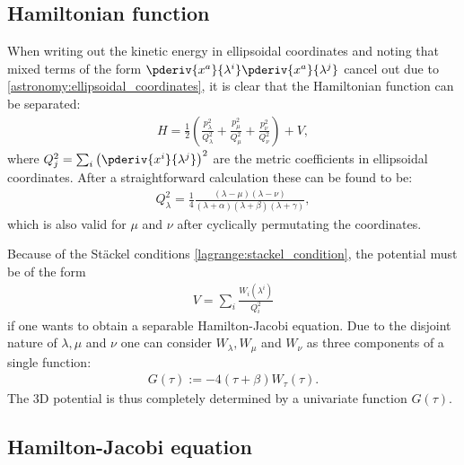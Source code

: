 \subsection{Hamiltonian function}

    When writing out the kinetic energy in ellipsoidal coordinates and noting that mixed terms of the form $\pderiv{x^a}{\lambda^i}\pderiv{x^a}{\lambda^j}$ cancel out due to \eqref{astronomy:ellipsoidal_coordinates}, it is clear that the Hamiltonian function can be separated:
    \begin{gather}
        H = \frac{1}{2}\left(\frac{p_\lambda^2}{Q_\lambda^2} + \frac{p_\mu^2}{Q_\mu^2} + \frac{p_\nu^2}{Q_\nu^2}\right) + V,
    \end{gather}
    where $Q_j^2 = \sum_i\left(\pderiv{x^i}{\lambda^j}\right)^2$ are the metric coefficients in ellipsoidal coordinates. After a straightforward calculation these can be found to be:
    \begin{gather}
        Q_\lambda^2 = \frac{1}{4}\frac{(\lambda-\mu)(\lambda-\nu)}{(\lambda+\alpha)(\lambda+\beta)(\lambda+\gamma)},
    \end{gather}
    which is also valid for $\mu$ and $\nu$ after cyclically permutating the coordinates.

    Because of the St\"ackel conditions \eqref{lagrange:stackel_condition}, the potential must be of the form
    \begin{gather}
        V = \sum_i\frac{W_i(\lambda^i)}{Q_i^2}
    \end{gather}
    if one wants to obtain a separable Hamilton-Jacobi equation. Due to the disjoint nature of $\lambda,\mu$ and $\nu$ one can consider $W_\lambda,W_\mu$ and $W_\nu$ as three components of a single function:
    \begin{gather}
        G(\tau) := -4(\tau+\beta)W_\tau(\tau).
    \end{gather}
    The 3D potential is thus completely determined by a univariate function $G(\tau)$.

\subsection{Hamilton-Jacobi equation}

